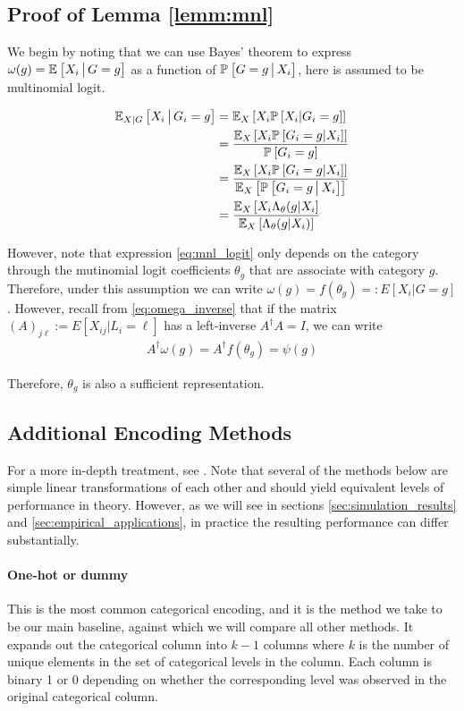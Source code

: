 \documentclass{article}
\theoremstyle{plain}
\theoremstyle{definition}
\theoremstyle{remark}
\begin{document}
\subsection{Proof of Lemma \ref{lemm:mnl}}

We begin by noting that we can use Bayes' theorem to express $\omega(g) = \EE{ X_{i} \cond G=g }$ as a function of $\PP{G=g \cond X_{i} }$, here is assumed to be multinomial logit.

\begin{align}
  \EE[X|G] { X_{i} \cond G_{i} = g }
  &=  \EE[X] { X_{i} \PP{X_{i} | G_{i} = g} }  \\
  &= \frac{\EE[X]{ X_{i} \PP{G_{i} = g|X_{i}}}}{\PP{G_{i} = g}} \label{eq:mnl_bayes} \\
  &= \frac{\EE[X]{ X_{i} \PP{G_{i} = g|X_{i}}}}{\EE[X] { \PP{G_{i} = g \cond X_{i}}}}  \\
  &= \frac{\EE[X]{ X_{i} \Lambda_{\theta}(g|X_{i}} }{ \EE[X]{\Lambda_{\theta}( g | X_{i})}}  \label{eq:mnl_logit}
\end{align}

\noindent However, note that expression \eqref{eq:mnl_logit} only depends on the category through the mutinomial logit coefficients $\theta_{g}$ that are associate with category $g$. Therefore, under this assumption we can write $\omega(g) = f(\theta_g) =: E[X_{i} | G=g]$. However, recall from \eqref{eq:omega_inverse} that if the matrix $(A)_{j\ell} := E[X_{ij} | L_{i}=\ell]$ has a left-inverse $A^{\dagger}A = I$, we can write
\begin{align}
A^\dagger \omega(g) = A^\dagger f(\theta_{g}) = \psi(g)
\end{align}

\noindent Therefore, $\theta_{g}$ is also a sufficient representation.


\subsection{Additional Encoding Methods}{\label{app:encodings}}

For a more in-depth treatment, see \cite{venables2016codingmatrices}. Note that several of the methods below are simple linear transformations of each other and should yield equivalent levels of performance in theory. However, as we will see in sections \ref{sec:simulation_results} and \ref{sec:empirical_applications}, in practice the resulting performance can differ substantially.

\paragraph{One-hot or dummy} This is the most common categorical encoding, and it is the method we take to be our main baseline, against which we will compare all other methods. It expands out the categorical column into $k-1$ columns where $k$ is the number of unique elements in the set of categorical levels in the column. Each column is binary 1 or 0 depending on whether the corresponding level was observed in the original categorical column. \citep[~sec 2.3.2]{murphy2012machine}
\end{document}
